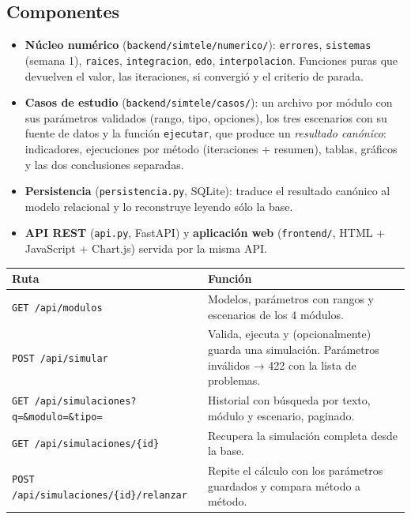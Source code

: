 \documentclass[11pt,letterpaper]{article}
\begin{document}
\subsection{Componentes}
\begin{itemize}
\item \textbf{Núcleo numérico} (\texttt{backend/simtele/numerico/}): \texttt{errores}, \texttt{sistemas} (semana 1), \texttt{raices}, \texttt{integracion}, \texttt{edo}, \texttt{interpolacion}. Funciones puras que devuelven el valor, las iteraciones, si convergió y el criterio de parada.
\item \textbf{Casos de estudio} (\texttt{backend/simtele/casos/}): un archivo por módulo con sus parámetros validados (rango, tipo, opciones), los tres escenarios con su fuente de datos y la función \texttt{ejecutar}, que produce un \emph{resultado canónico}: indicadores, ejecuciones por método (iteraciones + resumen), tablas, gráficos y las dos conclusiones separadas.
\item \textbf{Persistencia} (\texttt{persistencia.py}, SQLite): traduce el resultado canónico al modelo relacional y lo reconstruye leyendo sólo la base.
\item \textbf{API REST} (\texttt{api.py}, FastAPI) y \textbf{aplicación web} (\texttt{frontend/}, HTML + JavaScript + Chart.js) servida por la misma API.
\end{itemize}

{\small
\begin{longtable}{p{5.6cm}p{9.6cm}}
\toprule
\textbf{Ruta} & \textbf{Función}\\
\midrule
\texttt{GET /api/modulos} & Modelos, parámetros con rangos y escenarios de los 4 módulos.\\
\texttt{POST /api/simular} & Valida, ejecuta y (opcionalmente) guarda una simulación. Parámetros inválidos → 422 con la lista de problemas.\\
\texttt{GET /api/simulaciones?q=\&modulo=\&tipo=} & Historial con búsqueda por texto, módulo y escenario, paginado.\\
\texttt{GET /api/simulaciones/\{id\}} & Recupera la simulación completa desde la base.\\
\texttt{POST /api/simulaciones/\{id\}/relanzar} & Repite el cálculo con los parámetros guardados y compara método a método.\\
\bottomrule
\end{longtable}}
\end{document}
